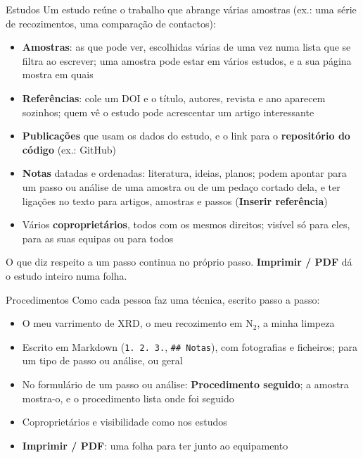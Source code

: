 \documentclass[aspectratio=169,11pt]{beamer}
\newcommand{\ui}[1]{\textsf{\textbf{#1}}}
\begin{document}
\begin{frame}{Estudos}
  Um \alert{estudo} reúne o trabalho que abrange várias amostras
  (ex.: uma série de recozimentos, uma comparação de contactos):
  \begin{itemize}
    \item \textbf{Amostras}: as que pode ver, escolhidas várias de uma vez numa lista
          que se filtra ao escrever; uma amostra pode estar em vários estudos,
          e a sua página mostra em quais
    \item \textbf{Referências}: cole um DOI e o título, autores, revista e ano
          aparecem sozinhos; quem vê o estudo pode acrescentar um artigo interessante
    \item \textbf{Publicações} que usam os dados do estudo, e o link para o
          \textbf{repositório do código} (ex.: GitHub)
    \item \textbf{Notas} datadas e ordenadas: literatura, ideias, planos;
          podem apontar para um passo ou análise de uma amostra
          ou de um pedaço cortado dela, e ter ligações no texto para artigos,
          amostras e passos (\ui{Inserir referência})
    \item Vários \textbf{coproprietários}, todos com os mesmos direitos;
          visível só para eles, para as suas equipas ou para todos
  \end{itemize}
  \small O que diz respeito a um passo continua no próprio passo.
  \ui{Imprimir / PDF} dá o estudo inteiro numa folha.
\end{frame}

\begin{frame}{Procedimentos}
  Como cada pessoa faz uma técnica, escrito \alert{passo a passo}:
  \begin{itemize}
    \item O meu varrimento de XRD, o meu recozimento em N$_2$, a minha limpeza
    \item Escrito em Markdown (\texttt{1.}~\texttt{2.}~\texttt{3.}, \texttt{\#\# Notas}),
          com fotografias e ficheiros; para um tipo de passo ou análise, ou geral
    \item No formulário de um passo ou análise: \ui{Procedimento seguido};
          a amostra mostra-o, e o procedimento lista onde foi seguido
    \item Coproprietários e visibilidade como nos estudos
    \item \ui{Imprimir / PDF}: uma folha para ter junto ao equipamento
  \end{itemize}
\end{frame}
\end{document}
